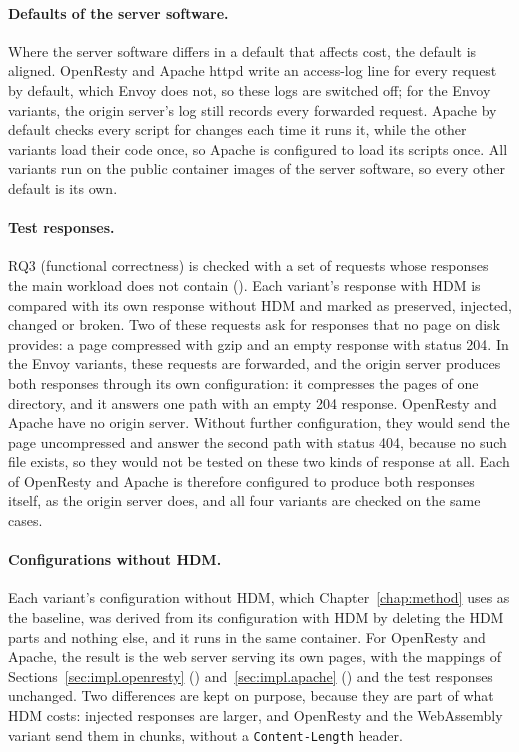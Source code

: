 \documentclass{rptuma}
\begin{document}
\paragraph{Defaults of the server software.} Where the server software differs in a default that affects cost, the default
is aligned. OpenResty and Apache httpd write an access-log line for every request by default, which
Envoy does not, so these logs are switched off; for the Envoy variants, the origin server's log
still records every forwarded request. Apache by default checks every script for changes each time
it runs it, while the other variants load their code once, so Apache is configured to load its
scripts once. All variants run on the public container images of the server software, so every other
default is its own.

\paragraph{Test responses.} RQ3 (functional correctness) is checked with a set of requests whose
responses the main workload does not contain (). Each variant's
response with HDM is compared with its own response without HDM and marked as preserved, injected,
changed or broken. Two of these requests ask for responses that no page on disk provides: a page
compressed with gzip and an empty response with status 204. In the Envoy variants, these requests are
forwarded, and the origin server produces both responses through its own configuration: it
compresses the pages of one directory, and it answers one path with an empty 204 response. OpenResty and Apache have no origin server. Without further configuration, they would send the page
uncompressed and answer the second path with status 404, because no such file exists, so they
would not be tested on these two kinds of response at all. Each of OpenResty and Apache is therefore
configured to produce both responses itself, as the origin server does, and all four variants are
checked on the same cases.


\paragraph{Configurations without HDM.} Each variant's configuration without HDM, which
Chapter~\ref{chap:method} uses as the baseline, was derived from its configuration with HDM by
deleting the HDM parts and nothing else, and it runs in the same container. For OpenResty and Apache, the result is the web server serving its own pages, with the mappings of
Sections~\ref{sec:impl.openresty} (\emph{}) and~\ref{sec:impl.apache} (\emph{}) and the test responses unchanged. Two
differences are kept on purpose, because they are part of what HDM costs: injected responses are
larger, and OpenResty and the WebAssembly variant send them in chunks, without a
\texttt{Content-Length} header.
\end{document}
